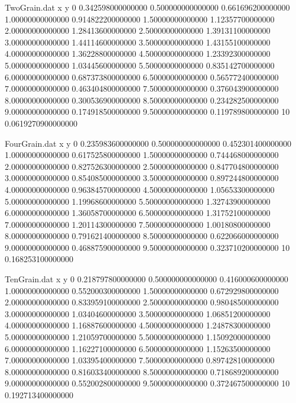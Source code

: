 \begin{filecontents}{TwoGrain.dat}
x y
0	0.342598000000000
0.500000000000000	0.661696200000000
1.00000000000000	0.914822200000000
1.50000000000000	1.12357700000000
2.00000000000000	1.28413600000000
2.50000000000000	1.39131100000000
3.00000000000000	1.44114600000000
3.50000000000000	1.43155100000000
4.00000000000000	1.36228800000000
4.50000000000000	1.23392300000000
5.00000000000000	1.03445600000000
5.50000000000000	0.835142700000000
6.00000000000000	0.687373800000000
6.50000000000000	0.565772400000000
7.00000000000000	0.463404800000000
7.50000000000000	0.376043900000000
8.00000000000000	0.300536900000000
8.50000000000000	0.234282500000000
9.00000000000000	0.174918500000000
9.50000000000000	0.119789800000000
10	0.0619270900000000
\end{filecontents}

\begin{filecontents}{FourGrain.dat}
x y
0	0.235983600000000
0.500000000000000	0.452301400000000
1.00000000000000	0.617525800000000
1.50000000000000	0.744468000000000
2.00000000000000	0.827526300000000
2.50000000000000	0.847704800000000
3.00000000000000	0.854085000000000
3.50000000000000	0.897244800000000
4.00000000000000	0.963845700000000
4.50000000000000	1.05653300000000
5.00000000000000	1.19968600000000
5.50000000000000	1.32743900000000
6.00000000000000	1.36058700000000
6.50000000000000	1.31752100000000
7.00000000000000	1.20114300000000
7.50000000000000	1.00180800000000
8.00000000000000	0.791621400000000
8.50000000000000	0.622066000000000
9.00000000000000	0.468875900000000
9.50000000000000	0.323710200000000
10	0.168253100000000
\end{filecontents}

\begin{filecontents}{TenGrain.dat}
x y
0	0.218797800000000
0.500000000000000	0.416000600000000
1.00000000000000	0.552000300000000
1.50000000000000	0.672929800000000
2.00000000000000	0.833959100000000
2.50000000000000	0.980485000000000
3.00000000000000	1.03404600000000
3.50000000000000	1.06851200000000
4.00000000000000	1.16887600000000
4.50000000000000	1.24878300000000
5.00000000000000	1.21059700000000
5.50000000000000	1.15092000000000
6.00000000000000	1.16227100000000
6.50000000000000	1.15263500000000
7.00000000000000	1.03395400000000
7.50000000000000	0.897428100000000
8.00000000000000	0.816033400000000
8.50000000000000	0.718689200000000
9.00000000000000	0.552002800000000
9.50000000000000	0.372467500000000
10	0.192713400000000
\end{filecontents}

